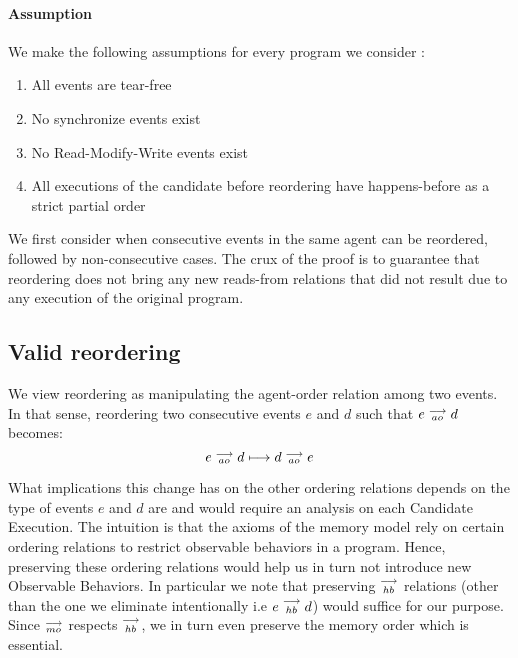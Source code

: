     \paragraph{Assumption}
    We make the following assumptions for every program we consider :
    \begin{enumerate}
        \item All events are tear-free
        \item No synchronize events exist
        \item No Read-Modify-Write events exist
        \item All executions of the candidate before reordering have happens-before as a strict partial order
    \end{enumerate}
    
    We first consider when consecutive events in the same agent can be reordered, followed by non-consecutive cases. The crux of the proof is to guarantee that reordering does not bring any new reads-from relations that did not result due to any execution of the original program. 
    


    

    

\subsection{Valid reordering}
    We view reordering as manipulating the agent-order relation among two events. In that sense, reordering two consecutive events $e$ and $d$ such that $e \stackrel{\longrightarrow}{_{ao}} d$ becomes:
    \[
        e \stackrel{\longrightarrow}{_{ao}} d 
        \longmapsto
        d \stackrel{\longrightarrow}{_{ao}} e 
    \]

    What implications this change has on the other ordering relations depends on the type of events $e$ and $d$ are and would require an analysis on each Candidate Execution. 
    The intuition is that the axioms of the memory model rely on certain ordering relations to restrict observable behaviors in a program.
    Hence, preserving these ordering relations would help us in turn not introduce new Observable Behaviors.
    In particular we note that preserving $\stackrel{\longrightarrow}{_{hb}}$ relations (other than the one we eliminate intentionally i.e $e\stackrel{\longrightarrow}{_{hb}}d$) would suffice for our purpose. 
    Since $\stackrel{\longrightarrow}{_{mo}}$ respects $\stackrel{\longrightarrow}{_{hb}}$, we in turn even preserve the memory order which is essential.  

